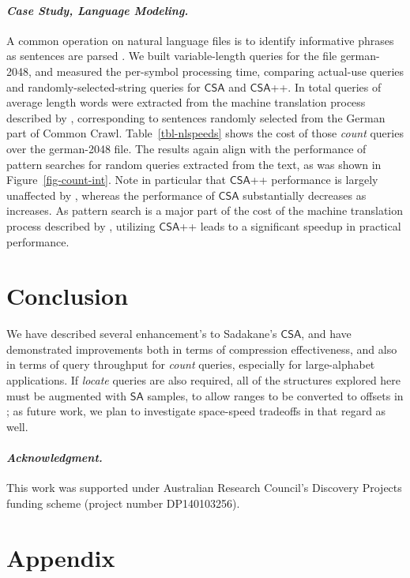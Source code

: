 \documentclass{llncs}
\newcommand{\myparagraph}[1]{\paragraph*{\normalsize\it#1.}}
\newcommand{\CSA}[0]{\ensuremath{\mathsf{CSA}}}
\newcommand{\SUFF}[0]{\ensuremath{\mathsf{SA}}}
\begin{document}
\myparagraph{Case Study, Language Modeling}

A common operation on natural language files is to identify
informative phrases as sentences are parsed {\cite{sphc-emnlp15}}.
We built variable-length queries for the file german-2048, and
measured the per-symbol processing time, comparing actual-use
queries and randomly-selected-string queries for {\CSA} and
{\CSA++}.
In total  queries of average length  words were
extracted from the machine translation process described by
{\citeauthor{sphc-emnlp15}}, corresponding to  sentences
randomly selected from the German part of Common Crawl.
Table~\ref{tbl-nlspeeds} shows the cost of those {\emph{count}}
queries over the german-2048 file.
The results again align with the performance of pattern searches for
random queries extracted from the text, as was shown in
Figure~\ref{fig-count-int}.
Note in particular that {\CSA++} performance is largely unaffected by
, whereas the performance of {\CSA} substantially decreases as 
increases.
As pattern search is a major part of the cost of the machine
translation process described by {\citet{sphc-emnlp15}}, utilizing
{\CSA++} leads to a significant speedup in practical performance.


\section{Conclusion}
\label{sec-conclusion}


We have described several enhancement's to Sadakane's {\CSA}, and
have demonstrated improvements both in terms of compression
effectiveness, and also in terms of query throughput for
{\emph{count}} queries, especially for large-alphabet applications.
If {\emph{locate}} queries are also required, all of the structures
explored here must be augmented with {\SUFF} samples, to allow
 ranges to be converted to offsets in ; as future work,
we plan to investigate space-speed tradeoffs in that regard as well.



\myparagraph{Acknowledgment}
This work was supported under Australian Research Council's Discovery
Projects funding scheme (project number DP140103256).

\renewcommand{\bibfont}{\small}
\setlength\bibitemsep{2.0pt}
\printbibliography

\newpage
\section*{Appendix}
\end{document}
